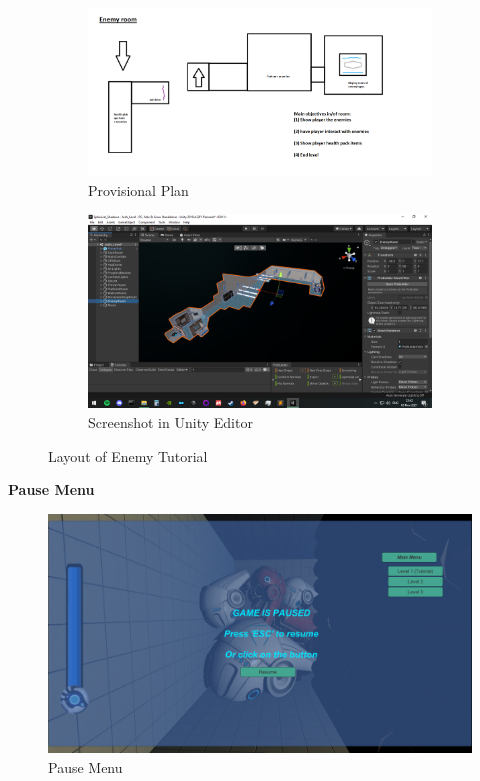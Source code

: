 \begin{figure}[H]
\centering
\begin{subfigure}{0.5\textwidth}
  \centering
  \includegraphics[width=1\linewidth]{Figures/enemyplan.png}
  \caption{Provisional Plan}
\end{subfigure}%
\begin{subfigure}{0.5\textwidth}
  \centering
  \includegraphics[width=1\linewidth]{Figures/enemy.png}
  \caption{Screenshot in Unity Editor}
\end{subfigure}
\caption{Layout of Enemy Tutorial}
\end{figure}




\textbf{Pause Menu}\\

\begin{figure}[H]
\centering
\includegraphics[scale=0.45]{Figures/pause.png}
\caption{Pause Menu}
\label{pause}
\end{figure}



